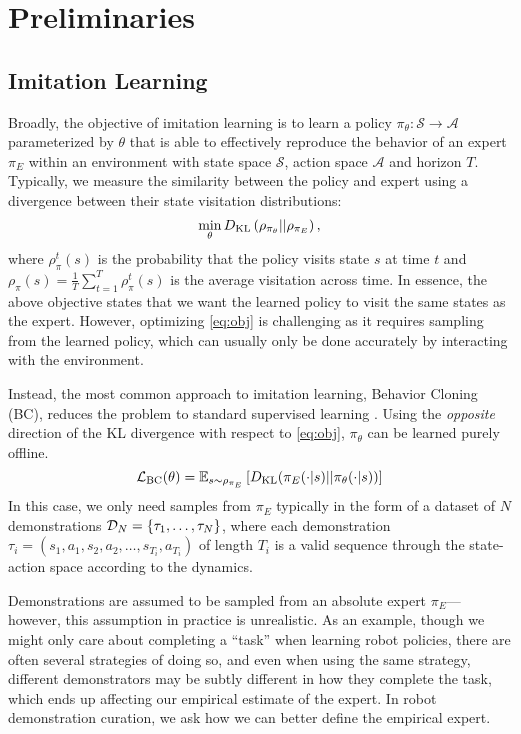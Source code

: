 \section{Preliminaries}
\label{sec:preliminaries}

\subsection{Imitation Learning}
Broadly, the objective of imitation learning is to learn a policy $\pi_\theta: \mathcal{S} \rightarrow \mathcal{A}$ parameterized by $\theta$ that is able to effectively reproduce the behavior of an expert $\pi_E$ within an environment with state space $\mathcal{S}$, action space $\mathcal{A}$ and horizon $T$.
Typically, we measure the similarity between the policy and expert using a divergence between their state visitation distributions:
\begin{equation}
    \min_\theta D_\text{KL}\left(\rho_{\pi_\theta} || \rho_{\pi_E} \right),
\label{eq:obj}
\end{equation}
where $\rho^t_{\pi}(s)$ is the probability that the policy visits state $s$ at time $t$ and $\rho_\pi(s) = \frac{1}{T}\sum_{t=1}^T \rho^t_{\pi}(s)$ is the average visitation across time. In essence, the above objective states that we want the learned policy to visit the same states as the expert. However, optimizing \cref{eq:obj} is challenging as it requires sampling from the learned policy, which can usually only be done accurately by interacting with the environment. 

Instead, the most common approach to imitation learning, Behavior Cloning (BC), reduces the problem to standard supervised learning \citep{ross2010efficient}. Using the \textit{opposite} direction of the KL divergence with respect to \cref{eq:obj}, $\pi_\theta$ can be learned purely offline.
\begin{equation}
\mathcal{L}_\text{BC}(\theta) = \mathbb{E}_{s \sim \rho_{\pi_E}}\left[D_\text{KL}(\pi_E(\cdot | s) || \pi_\theta( \cdot | s)) \right]
\label{eq:bc}
\end{equation}
In this case, we only need samples from $\pi_E$ typically in the form of a dataset of $N$ demonstrations $\mathcal{D}_N = \{\tau_1, \dots, \tau_N\}$, where each demonstration $\tau_i = (s_1, a_1, s_2, a_2, \dots, s_{T_i}, a_{T_i} )$  of length $T_i$ is a valid sequence through the state-action space according to the dynamics. 

Demonstrations are assumed to be sampled from an absolute expert $\pi_E$---however, this assumption in practice is unrealistic. As an example, though we might only care about completing a ``task'' when learning robot policies, there are often several strategies of doing so, and even when using the same strategy, different demonstrators may be subtly different in how they complete the task, which ends up affecting our empirical estimate of the expert. In robot demonstration curation, we ask how we can better define the empirical expert.

